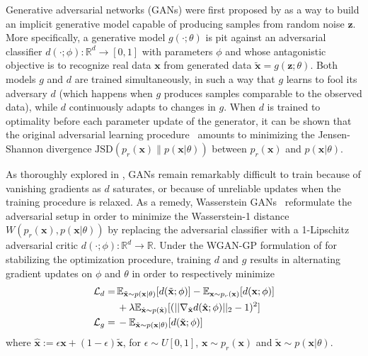\documentclass[twocolumn,superscriptaddress,aps]{revtex4-1}
\theoremstyle{plain}
\begin{document}
Generative adversarial networks (GANs) were first proposed by
\cite{goodfellow2014generative} as a way to build an implicit generative model
capable of producing samples from random noise $\mathbf{z}$. More specifically,
a generative model $g(\cdot; \theta)$ is pit against an adversarial
classifier $d(\cdot; \phi):\mathbb{R}^d \to [0,1]$ with parameters $\phi$ and whose antagonistic objective is to recognize real data $\mathbf{x}$
from generated data $\tilde{\mathbf{x}} = g(\mathbf{z}; \theta)$. Both models $g$ and $d$
are trained simultaneously, in such a way that $g$ learns to fool
its adversary $d$ (which happens when $g$ produces samples comparable to the
observed data), while $d$ continuously adapts to changes in $g$. When $d$ is
trained to optimality before each parameter update of the generator, it can
be shown that the original adversarial learning procedure~\cite{goodfellow2014generative} amounts to minimizing
the Jensen-Shannon divergence $\text{JSD}(p_r(\mathbf{x}) \parallel p(\mathbf{x}|\theta))$ between $p_r(\mathbf{x})$ and $p(\mathbf{x}|\theta)$.

As thoroughly explored in \citep{2017arXiv170104862A}, GANs remain remarkably
difficult to train because of vanishing gradients as $d$ saturates, or because of
unreliable updates when the training procedure is relaxed. As a remedy,
Wasserstein GANs~\citep{2017arXiv170107875A} reformulate the adversarial
setup in order to minimize the Wasserstein-1 distance $W(p_r(\mathbf{x}), p(\mathbf{x}|\theta))$ by
replacing the adversarial classifier with a 1-Lipschitz adversarial critic
$d(\cdot; \phi) : \mathbb{R}^d \to \mathbb{R}$. Under the WGAN-GP formulation of \cite{2017arXiv170400028G}
for stabilizing the optimization procedure,
training $d$ and $g$ results in alternating gradient updates on $\phi$ and $\theta$ in order to respectively minimize
\begin{align}
    {\cal L}_d =\,& \mathbb{E}_{\tilde{\mathbf{x}} \sim p(\mathbf{x}|\theta)} [d(\tilde{\mathbf{x}};\phi)] - \mathbb{E}_{\mathbf{x} \sim p_r(\mathbf{x})} [d(\mathbf{x};\phi)]  \nonumber \\
                  & + \lambda \mathbb{E}_{\hat{\mathbf{x}} \sim p({\hat{\mathbf{x}})}} [(|| \nabla_{\hat{\mathbf{x}}} d({\hat{\mathbf{x}}};\phi) ||_2 - 1)^2] \\
    {\cal L}_g =\,& -\mathbb{E}_{\tilde{\mathbf{x}} \sim p(\mathbf{x}|\theta)} [d(\tilde{\mathbf{x}};\phi)]
\end{align}
where ${\hat{\mathbf{x}}} := \epsilon \mathbf{x} +
(1-\epsilon)\tilde{\mathbf{x}}$, for $\epsilon \sim U[0,1]$, $\mathbf{x} \sim
p_r(\mathbf{x})$ and $\tilde{\mathbf{x}} \sim p(\mathbf{x}|\theta)$.
\end{document}
